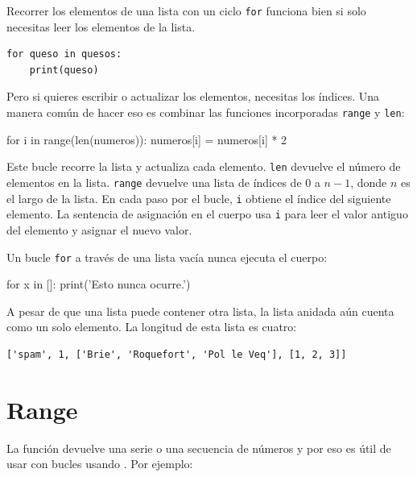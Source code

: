 
Recorrer los elementos de una lista 
con un ciclo \texttt{for} funciona bien si solo necesitas leer los elementos de la
lista.

\begin{Verbatim}[frame=single]
for queso in quesos:
    print(queso)
\end{Verbatim}
%

Pero si quieres escribir o actualizar los elementos,
necesitas los índices.  Una manera común de hacer eso es combinar
las funciones incorporadas \texttt{range} y \texttt{len}:

\begin{python}[frame=single]
for i in range(len(numeros)):
    numeros[i] = numeros[i] * 2
\end{python}
%
Este bucle recorre la lista y actualiza cada elemento.  \texttt{len}
devuelve el número de elementos en la lista.  \texttt{range} devuelve
una lista de índices de 0 a $n-1$, donde $n$ es el largo de
la lista.  En cada paso por el bucle, \texttt{i} obtiene el índice
del siguiente elemento.  La sentencia de asignación en el cuerpo usa
\texttt{i} para leer el valor antiguo del elemento y asignar el
nuevo valor.

Un bucle \texttt{for} a través de una lista vacía nunca ejecuta el cuerpo:

\begin{python}[frame=single]
for x in []:
    print('Esto nunca ocurre.')
\end{python}
%
A pesar de que una lista puede contener otra lista, la lista
anidada aún cuenta como un solo elemento.  La longitud de esta lista es
cuatro:

\begin{Verbatim}[frame=single]
['spam', 1, ['Brie', 'Roquefort', 'Pol le Veq'], [1, 2, 3]]
\end{Verbatim}





\section{Range}\label{depuraciuxf3n}

La función  devuelve una serie o una secuencia de números y por eso es útil de usar con bucles  usando . Por ejemplo:

